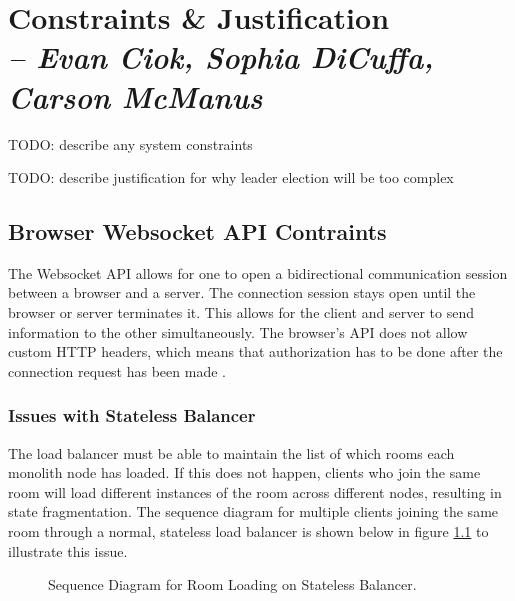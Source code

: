 \chapter{Constraints \& Justification \\
  \small{\textit{-- Evan Ciok, Sophia DiCuffa, Carson McManus}}
  \label{Chapter::ConstraintsJustification}}


TODO: describe any system constraints

TODO: describe justification for why leader election will be too complex

\section{Browser Websocket API Contraints}

The Websocket API allows for one to open a bidirectional communication session between a browser and a server. The connection session stays open until the browser or server terminates it. 
This allows for the client and server to send information to the other simultaneously. The browser's API does not allow custom HTTP headers, which means that authorization has to be done after the connection request has been made \cite{MDNWebSocket} \cite{HerokuWebSocket}.

\subsection{Issues with Stateless Balancer}

The load balancer must be able to maintain the list of which rooms each monolith node has loaded. If this does not happen, clients who join the same room will load different instances of the room across different nodes, resulting in state fragmentation. The sequence diagram for multiple clients joining the same room through a normal, stateless load balancer is shown below in figure \ref{Figure::join-room-stateless} to illustrate this issue.

\begin{figure}[!htb]
  \centering
  \caption{\label{Figure::join-room-stateless} Sequence Diagram for Room Loading on Stateless Balancer.}
\end{figure}


